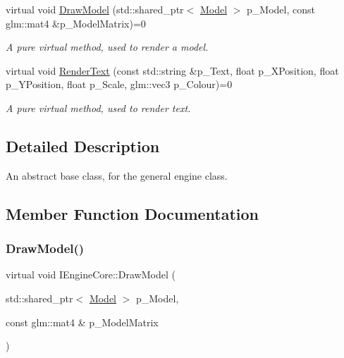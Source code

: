 \begin{DoxyCompactItemize}
virtual void \mbox{\hyperlink{class_i_engine_core_aceb59e8067ef95f2c476d92a6fde5002}{Draw\+Model}} (std\+::shared\+\_\+ptr$<$ \mbox{\hyperlink{class_model}{Model}} $>$ p\+\_\+\+Model, const glm\+::mat4 \&p\+\_\+\+Model\+Matrix)=0
\begin{DoxyCompactList}\small\item\em A pure virtual method, used to render a model. \end{DoxyCompactList}\item 
virtual void \mbox{\hyperlink{class_i_engine_core_ae3a8fc8e24c25afd91944e398d75a987}{Render\+Text}} (const std\+::string \&p\+\_\+\+Text, float p\+\_\+\+X\+Position, float p\+\_\+\+Y\+Position, float p\+\_\+\+Scale, glm\+::vec3 p\+\_\+\+Colour)=0
\begin{DoxyCompactList}\small\item\em A pure virtual method, used to render text. \end{DoxyCompactList}\end{DoxyCompactItemize}


\subsection{Detailed Description}
An abstract base class, for the general engine class. 

\subsection{Member Function Documentation}
\mbox{\label{class_i_engine_core_aceb59e8067ef95f2c476d92a6fde5002}} 
\subsubsection{\texorpdfstring{DrawModel()}{DrawModel()}}
{\footnotesize\ttfamily virtual void I\+Engine\+Core\+::\+Draw\+Model (\begin{DoxyParamCaption}\item[{std\+::shared\+\_\+ptr$<$ \mbox{\hyperlink{class_model}{Model}} $>$}]{p\+\_\+\+Model,  }\item[{const glm\+::mat4 \&}]{p\+\_\+\+Model\+Matrix }\end{DoxyParamCaption})\hspace{0.3cm}{\ttfamily [pure virtual]}}



